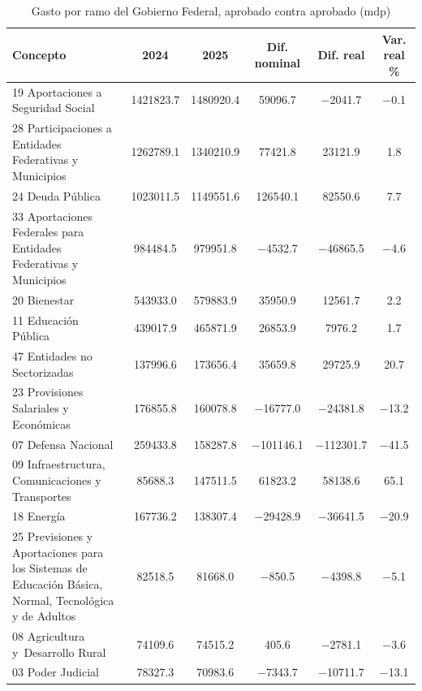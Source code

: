 \begin{table}[htbp]
\centering
\caption{Gasto por ramo del Gobierno Federal, aprobado contra aprobado (mdp)}
\label{tab:C4_2}
\footnotesize
\setlength{\tabcolsep}{4pt}
\begin{tabular}{L{4.2cm}SSSSS}
\toprule
{Concepto} & {2024} & {2025} & {Dif. nominal} & {Dif. real} & {Var. real \%} \\
\midrule
{19 Aportaciones a Seguridad Social} & \num{1421823.7} & \num{1480920.4} & \num{59096.7} & \num{-2041.7} & \num{-0.1} \\
{28 Participaciones a Entidades Federativas y Municipios} & \num{1262789.1} & \num{1340210.9} & \num{77421.8} & \num{23121.9} & \num{1.8} \\
{24 Deuda Pública} & \num{1023011.5} & \num{1149551.6} & \num{126540.1} & \num{82550.6} & \num{7.7} \\
{33 Aportaciones Federales para Entidades Federativas y Municipios} & \num{984484.5} & \num{979951.8} & \num{-4532.7} & \num{-46865.5} & \num{-4.6} \\
{20 Bienestar} & \num{543933.0} & \num{579883.9} & \num{35950.9} & \num{12561.7} & \num{2.2} \\
{11 Educación Pública} & \num{439017.9} & \num{465871.9} & \num{26853.9} & \num{7976.2} & \num{1.7} \\
{47 Entidades no Sectorizadas} & \num{137996.6} & \num{173656.4} & \num{35659.8} & \num{29725.9} & \num{20.7} \\
{23 Provisiones Salariales y Económicas} & \num{176855.8} & \num{160078.8} & \num{-16777.0} & \num{-24381.8} & \num{-13.2} \\
{07 Defensa Nacional} & \num{259433.8} & \num{158287.8} & \num{-101146.1} & \num{-112301.7} & \num{-41.5} \\
{09 Infraestructura, Comunicaciones y Transportes} & \num{85688.3} & \num{147511.5} & \num{61823.2} & \num{58138.6} & \num{65.1} \\
{18 Energía} & \num{167736.2} & \num{138307.4} & \num{-29428.9} & \num{-36641.5} & \num{-20.9} \\
{25 Previsiones y Aportaciones para los Sistemas de Educación Básica, Normal, Tecnológica y de Adultos} & \num{82518.5} & \num{81668.0} & \num{-850.5} & \num{-4398.8} & \num{-5.1} \\
{08 Agricultura y Desarrollo Rural} & \num{74109.6} & \num{74515.2} & \num{405.6} & \num{-2781.1} & \num{-3.6} \\
{03 Poder Judicial} & \num{78327.3} & \num{70983.6} & \num{-7343.7} & \num{-10711.7} & \num{-13.1} \\

\end{tabular}
\end{table}
